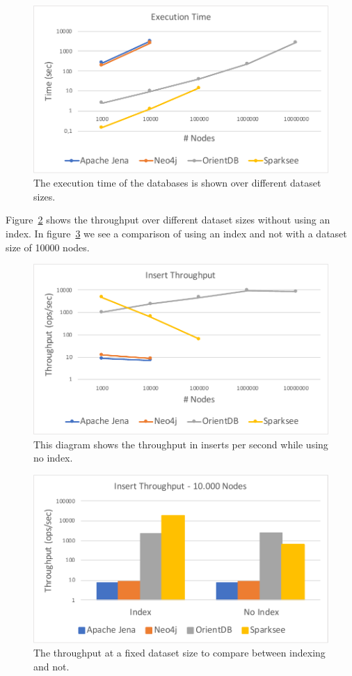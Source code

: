 \begin{figure}[h!]
  \centering
  \includegraphics[width=.75\textwidth]{images/throughput/withIndexExecutionTime}
  \caption{The execution time of the databases is shown over different dataset sizes.}
  \label{fig:withIndexExecutionTime}
\end{figure}

Figure~\ref{fig:withoutIndexThroughput} shows the throughput over different dataset sizes without using an index.
In figure~\ref{fig:withWithoutIndexThroughputFixNodes} we see a comparison of using an index and not with a dataset size of 10000 nodes.

\begin{figure}[h!]
  \centering
  \includegraphics[width=.75\textwidth]{images/throughput/withoutIndexThroughput}
  \caption{This diagram shows the throughput in inserts per second while using no index.}
  \label{fig:withoutIndexThroughput}
\end{figure}

\begin{figure}[h!]
  \centering
  \includegraphics[width=.75\textwidth]{images/throughput/withWithoutIndexThroughputFixNodes}
  \caption{The throughput at a fixed dataset size to compare between indexing and not.}
  \label{fig:withWithoutIndexThroughputFixNodes}
\end{figure}

